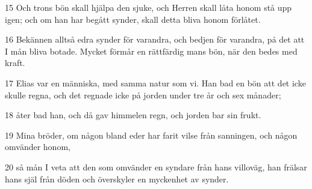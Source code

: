 \par 15 Och trons bön skall hjälpa den sjuke, och Herren skall låta honom stå upp igen; och om han har begått synder, skall detta bliva honom förlåtet.
\par 16 Bekännen alltså edra synder för varandra, och bedjen för varandra, på det att I mån bliva botade. Mycket förmår en rättfärdig mans bön, när den bedes med kraft.
\par 17 Elias var en människa, med samma natur som vi. Han bad en bön att det icke skulle regna, och det regnade icke på jorden under tre år och sex månader;
\par 18 åter bad han, och då gav himmelen regn, och jorden bar sin frukt.
\par 19 Mina bröder, om någon bland eder har farit vilse från sanningen, och någon omvänder honom,
\par 20 så mån I veta att den som omvänder en syndare från hans villoväg, han frälsar hans själ från döden och överskyler en myckenhet av synder.


